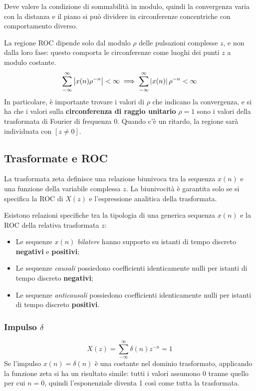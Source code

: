 Deve valere la condizione di sommabilità in modulo, quindi la convergenza varia con la distanza e il piano si può dividere in circonferenze concentriche con comportamento diverso. 

La regione ROC dipende solo dal modulo $\rho$ delle pulsazioni complesse $z$, e non dalla loro fase: questo comporta le circonferenze come luoghi dei punti $z$ a modulo costante.
$$ \sum_{-\infty}^{\infty}\left|x(n)\rho^{-n}\right| < \infty \implies  \sum_{-\infty}^{\infty}\left|x(n)\right|\rho^{-n} < \infty$$
In particolare, è importante trovare i valori di $\rho$ che indicano la convergenza, e si ha che i valori sulla \textbf{circonferenza di raggio unitario} $\rho = 1$ sono i valori della trasformata di Fourier di frequenza 0. Quando c'è un ritardo, la regione sarà individuata con $[z \neq 0]$.

\subsection{Trasformate e ROC}
La trasformata zeta definisce una relazione biunivoca tra la sequenza $x(n)$ e una funzione della variabile complessa $z$. La biunivocità è garantita solo se si specifica la ROC di $X(z)$ e l'espressione analitica della trasformata.

Esistono relazioni specifiche tra la tipologia di una generica sequenza $x(n)$ e la ROC della relativa trasformata $z$:
\begin{itemize}
	\item Le sequenze $x(n)$ \textit{bilatere} hanno supporto su istanti di tempo discreto \textbf{negativi} e \textbf{positivi};
	\item Le sequenze \textit{causali} possiedono coefficienti identicamente nulli per istanti di tempo discreto \textbf{negativi};
	\item Le sequenze \textit{anticausali} possiedono coefficienti identicamente nulli per istanti di tempo discreto \textbf{positivi}.
\end{itemize}

\subsubsection{Impulso $\delta$}
$$X(z) = \sum_{-\infty}^{\infty} \delta(n) z^{-n} = 1$$
Se l'impulso $x(n) = \delta(n)$ è una costante nel dominio trasformato, applicando la funzione zeta si ha un risultato simile: tutti i valori assumono 0 tranne quello per cui $n = 0$, quindi l'esponenziale diventa 1 così come tutta la trasformata. 

